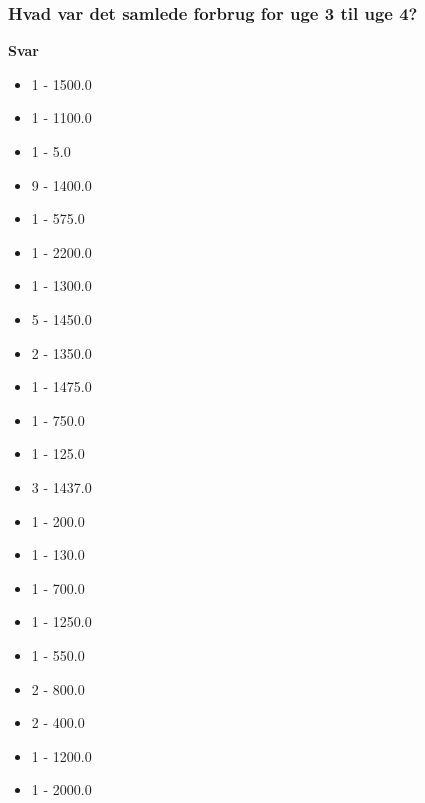 \subsubsection{Hvad var det samlede forbrug for uge 3 til uge 4?}
\textbf{Svar}
\begin{itemize}
    \item 1 - 1500.0
    \item 1 - 1100.0
    \item 1 - 5.0
    \item 9 - 1400.0
    \item 1 - 575.0
    \item 1 - 2200.0
    \item 1 - 1300.0
    \item 5 - 1450.0
    \item 2 - 1350.0
    \item 1 - 1475.0
    \item 1 - 750.0
    \item 1 - 125.0
    \item 3 - 1437.0
    \item 1 - 200.0
    \item 1 - 130.0
    \item 1 - 700.0
    \item 1 - 1250.0
    \item 1 - 550.0
    \item 2 - 800.0
    \item 2 - 400.0
    \item 1 - 1200.0
    \item 1 - 2000.0    
\end{itemize}

